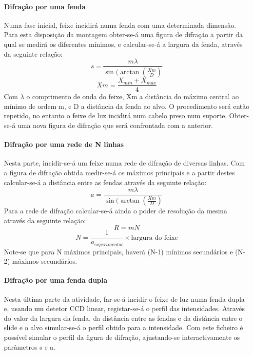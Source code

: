 \documentclass[10pt,a4paper]{article}
\begin{document}
{\paragraph*{Difração por uma fenda}
Numa fase inicial, feixe incidirá numa fenda com uma determinada dimensão. Para esta disposição da montagem obter-se-á uma figura de difração a partir da qual se medirá os diferentes mínimos, e calcular-se-á a largura da fenda, através da seguinte relação:
\begin{equation}
s=\frac{m\lambda}{\sin(\arctan(\frac{Xm}{D})}
\end{equation}
\begin{equation}
Xm=\frac{X_{min}+X_{max}}{4}
\end{equation}
Com $\lambda$ o comprimento de onda do feixe, Xm a distância do máximo central ao mínimo de ordem m, e D a distância da fenda ao alvo.
O procedimento será então repetido, no entanto o feixe de luz incidirá num cabelo preso num suporte. Obter-se-á uma nova figura de difração que será confrontada com a anterior.
\paragraph*{Difração por uma rede de N linhas}
Nesta parte, incidir-se-á um feixe numa rede de difração de diversas linhas. Com a figura de difração obtida medir-se-á os máximos principais e a partir destes calcular-se-á a distância entre as fendas através da seguinte relação:
\begin{equation}
a=\frac{m\lambda}{\sin(\arctan(\frac{Xm}{D})}
\end{equation}
Para a rede de difração calcular-se-á ainda o poder de resolução da mesma através da seguinte relação:
\begin{equation}
R=mN
\end{equation}
\begin{equation}
N=\frac{1}{a_{experimental}}\times\text{largura do feixe}
\end{equation}
Note-se que para N máximos principais, haverá (N-1) mínimos secundários e (N-2) máximos secundários.
\paragraph*{Difração por uma fenda dupla}
Nesta última parte da atividade, far-se-á incidir o feixe de luz numa fenda dupla e, usando um detetor CCD linear, registar-se-á o perfil das intensidades. Através do valor da largura da fenda, da distância entre as fendas e da distância entre o slide e o alvo simular-se-á o perfil obtido para a intensidade. Com este ficheiro é possível simular o perfil da figura de difração, ajustando-se interactivamente os parâmetros s e a. 
}
\end{document}
